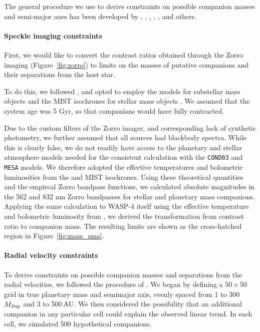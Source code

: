 \documentclass[12pt,twocolumn,tighten]{aastex62}
\begin{document}
The general procedure we use to derive constraints on possible
companion masses and semi-major axes has been developed by
\citet{wright_linear_trends_2007}, \citet{crepp_trends_2012},
\citet{montet_trends_2014}, \citet{knutson_friends_2014},
\citet{bryan_statistics_2016,bryan_excess_2019}, and others.

\paragraph{Speckle imaging constraints}

First, we would like to convert the contrast ratios obtained through
the Zorro imaging (Figure~\ref{fig:zorro}) to limits on the masses of
putative companions and their separations from the host star.

To do this, we followed \citet{montet_trends_2014}, and opted to
employ the \citet{baraffe_evolutionary_2003} models for substellar
mass objects and the MIST isochrones for stellar mass objects
\citep{paxton_modules_2011,paxton_modules_2013,paxton_modules_2015,dotter_mesa_2016,choi_mesa_2016}.
We assumed that the system age was 5 Gyr, so that companions would
have fully contracted.

Due to the custom filters of the Zorro imager, and corresponding lack
of synthetic photometry, we further assumed that all sources had
blackbody spectra. While this is clearly false, we do not readily have
access to the planetary and stellar atmosphere models needed for the
consistent calculation with the \texttt{COND03} and \texttt{MESA}
models.  We therefore adopted the effective temperatures and
bolometric luminosities from the \citet{baraffe_evolutionary_2003} and
MIST isochrones.  Using these theoretical quantities and the empircal
Zorro bandpass functions, we calculated absolute magnitudes in the 562
and 832 nm Zorro bandpasses for stellar and planetary mass companions.
Applying the same calculation to WASP-4 itself using the effective
temperature and bolometric luminosity from
, we derived the transformation from
contrast ratio to companion mass.
The resulting limits are shown as the cross-hatched region in
Figure~\ref{fig:mass_sma}.


\paragraph{Radial velocity constraints}

To derive constraints on possible companion masses and separations
from the radial velocities, we followed the procedure of
\citet{bryan_excess_2019}.  We began by defining a $50\times50$ grid
in true planetary mass and semimajor axis, evenly spaced from 1 to
300$\,$$M_{\rm Jup}$ and 3 to 500$\,$${\rm AU}$.  We then considered the
possibility that an additional companion in any particular cell could
explain the observed linear trend.  In each cell, we simulated 500
hypothetical companions.
\end{document}
